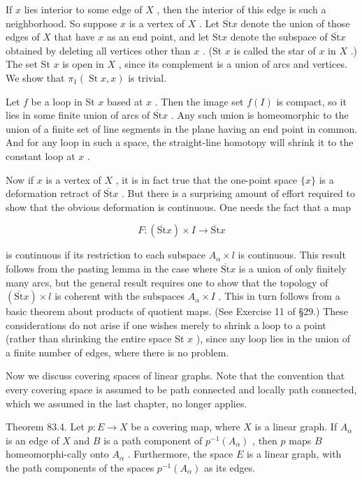 \documentclass[10pt]{article}
\begin{document}
If \(x\) lies interior to some edge of \(X\) , then the interior of this edge is such a neighborhood. So suppose \(x\) is a vertex of \(X\) . Let \(\overline{\mathrm{{St}}}x\) denote the union of those edges of \(X\) that have \(x\) as an end point, and let \(\mathrm{{St}}x\) denote the subspace of \(\overline{\mathrm{{St}}}x\) obtained by deleting all vertices other than \(x\) . (St \(x\) is called the star of \(x\) in \(X\) .) The set St \(x\) is open in \(X\) , since its complement is a union of arcs and vertices. We show that \({\pi }_{1}\left( {\operatorname{St}x,x}\right)\) is trivial.

Let \(f\) be a loop in St \(x\) based at \(x\) . Then the image set \(f\left( I\right)\) is compact, so it lies in some finite union of arcs of \(\overline{\mathrm{{St}}}x\) . Any such union is homeomorphic to the union of a finite set of line segments in the plane having an end point in common. And for any loop in such a space, the straight-line homotopy will shrink it to the constant loop at \(x\) .

Now if \(x\) is a vertex of \(X\) , it is in fact true that the one-point space \(\{ x\}\) is a deformation retract of \(\overline{\mathrm{{St}}}x\) . But there is a surprising amount of effort required to show that the obvious deformation is continuous. One needs the fact that a map

\[
F : \left( {\overline{\mathrm{{St}}}x}\right)  \times  I \rightarrow  \overline{\mathrm{{St}}}x
\]

is continuous if its restriction to each subspace \({A}_{\alpha } \times  l\) is continuous. This result follows from the pasting lemma in the case where \(\overline{\mathrm{{St}}}x\) is a union of only finitely many arcs, but the general result requires one to show that the topology of \(\left( {\overline{\mathrm{{St}}}x}\right)  \times  l\) is coherent with the subspaces \({A}_{\alpha } \times  I\) . This in turn follows from a basic theorem about products of quotient maps. (See Exercise 11 of §29.) These considerations do not arise if one wishes merely to shrink a loop to a point (rather than shrinking the entire space St \(x\) ), since any loop lies in the union of a finite number of edges, where there is no problem.

Now we discuss covering spaces of linear graphs. Note that the convention that every covering space is assumed to be path connected and locally path connected, which we assumed in the last chapter, no longer applies.

Theorem 83.4. Let \(p : E \rightarrow  X\) be a covering map, where \(X\) is a linear graph. If \({A}_{\alpha }\) is an edge of \(X\) and \(B\) is a path component of \({p}^{-1}\left( {A}_{\alpha }\right)\) , then \(p\) maps \(B\) homeomorphi-cally onto \({A}_{\alpha }\) . Furthermore, the space \(E\) is a linear graph, with the path components of the spaces \({p}^{-1}\left( {A}_{\alpha }\right)\) as its edges.
\end{document}
